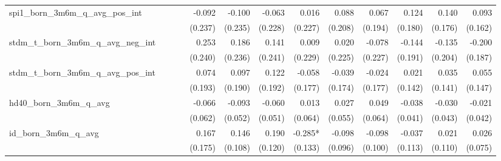 \begin{tabular}{lrrrrrrrrrrrr}
spi1\_born\_3m6m\_q\_avg\_pos\_int          &              &              &              &       -0.092 &       -0.100 &       -0.063 &        0.016 &        0.088 &        0.067 &        0.124 &        0.140 &        0.093 \\ 
                                            &              &              &              &      (0.237) &      (0.235) &      (0.228) &      (0.227) &      (0.208) &      (0.194) &      (0.180) &      (0.176) &      (0.162) \\ 
stdm\_t\_born\_3m6m\_q\_avg\_neg\_int       &              &              &              &        0.253 &        0.186 &        0.141 &        0.009 &        0.020 &       -0.078 &       -0.144 &       -0.135 &       -0.200 \\ 
                                            &              &              &              &      (0.240) &      (0.236) &      (0.241) &      (0.229) &      (0.225) &      (0.227) &      (0.191) &      (0.204) &      (0.187) \\ 
stdm\_t\_born\_3m6m\_q\_avg\_pos\_int       &              &              &              &        0.074 &        0.097 &        0.122 &       -0.058 &       -0.039 &       -0.024 &        0.021 &        0.035 &        0.055 \\ 
                                            &              &              &              &      (0.193) &      (0.190) &      (0.192) &      (0.177) &      (0.174) &      (0.177) &      (0.142) &      (0.141) &      (0.147) \\ 
hd40\_born\_3m6m\_q\_avg                    &              &              &              &       -0.066 &       -0.093 &       -0.060 &        0.013 &        0.027 &        0.049 &       -0.038 &       -0.030 &       -0.021 \\ 
                                            &              &              &              &      (0.062) &      (0.052) &      (0.051) &      (0.064) &      (0.055) &      (0.064) &      (0.041) &      (0.043) &      (0.042) \\ 
id\_born\_3m6m\_q\_avg                      &              &              &              &        0.167 &        0.146 &        0.190 &      -0.285* &       -0.098 &       -0.098 &       -0.037 &        0.021 &        0.026 \\ 
                                            &              &              &              &      (0.175) &      (0.108) &      (0.120) &      (0.133) &      (0.096) &      (0.100) &      (0.113) &      (0.110) &      (0.075) \\ 

\end{tabular}
